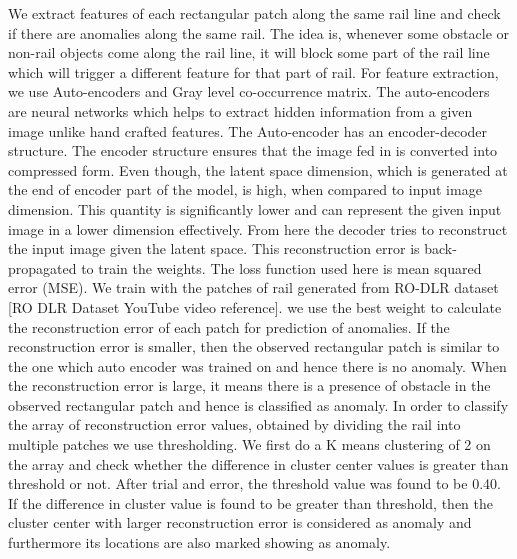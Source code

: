 \documentclass[conference]{IEEEtran}
\begin{document}
We extract features of each rectangular patch along the same rail line and check if there are anomalies along the same rail. The idea is, whenever some obstacle or non-rail objects come along the rail line, it will block some part of the rail line which will trigger a different feature for that part of rail. For feature extraction, we use Auto-encoders and Gray level co-occurrence matrix. The auto-encoders are neural networks which helps to extract hidden information from a given image unlike hand crafted features. The Auto-encoder has an encoder-decoder structure. The encoder structure ensures that the image fed in is converted into compressed form. Even though, the latent space dimension, which is generated at the end of encoder part of the model, is high, when compared to input image dimension. This quantity is significantly lower and can represent the given input image in a lower dimension effectively. From here the decoder tries to reconstruct the input image given the latent space. This reconstruction error is back-propagated to train the weights. The loss function used here is mean squared error (MSE). We train with the patches of rail generated from RO-DLR dataset [RO DLR Dataset YouTube video reference]. we use the best weight to calculate the reconstruction error of each patch for prediction of anomalies. If the reconstruction error is smaller, then the observed rectangular patch is similar to the one which auto encoder was trained on and hence there is no anomaly. When the reconstruction error is large, it means there is a presence of obstacle in the observed rectangular patch and hence is classified as anomaly. In order to classify the array of reconstruction error values, obtained by dividing the rail into multiple patches we use thresholding. We first do a K means clustering of 2 on the array and check whether the difference in cluster center values is greater than threshold or not. After trial and error, the threshold value was found to be 0.40. If the difference in cluster value is found to be greater than threshold, then the cluster center with larger reconstruction error is considered as anomaly and furthermore its locations are also marked showing as anomaly.
\end{document}
